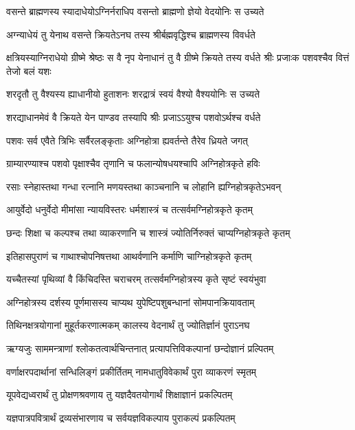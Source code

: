 \twolineshloka
{वसन्ते ब्राह्मणस्य स्यादाधेयोऽग्निर्नराधिप}
{वसन्तो ब्राह्मणो ज्ञेयो वेदयोनिः स उच्यते}


\twolineshloka
{अग्न्याधेयं तु येनाथ वसन्ते क्रियतेऽनघ}
{तस्य श्रीर्बह्मवृद्धिश्च ब्राह्मणस्य विवर्धते}


\threelineshloka
{क्षत्रियस्याग्निराधेयो ग्रीष्मे श्रेष्ठः स वै नृप}
{येनाधानं तु वै ग्रीष्मे क्रियते तस्य वर्धते}
{श्रीः प्रजाःक पशवश्चैव वित्तं तेजो बलं यशः}


\twolineshloka
{शरदृतौ तु वैश्यस्य ह्याधानीयो हुताशनः}
{शरद्रात्रं स्वयं वैश्यो वैश्ययोनिः स उच्यते}


\twolineshloka
{शरद्याधानमेवं वै क्रियते येन पाण्डव}
{तस्यापि श्रीः प्रजाऽऽयुश्च पशवोऽर्थश्च वर्धते}


\twolineshloka
{पशवः सर्व एवैते त्रिभिः सर्वैरलङ्कृताः}
{अग्निहोत्रा ह्यवर्तन्ते तैरेव ध्रियते जगत्}


\twolineshloka
{ग्राम्यारण्याश्च पशवो पृक्षाश्चैव तृणानि च}
{फलान्योषधयश्चापि अग्निहोत्रकृते हविः}


\twolineshloka
{रसाः स्नेहास्तथा गन्धा रत्नानि मणयस्तथा}
{काञ्चनानि च लोहानि ह्यग्निहोत्रकृतेऽभवन्}


\twolineshloka
{आयुर्वेदो धनुर्वेदो मीमांसा न्यायविस्तरः}
{धर्मशास्त्रं च तत्सर्वमग्निहोत्रकृते कृतम्}


\twolineshloka
{छन्दः शिक्षा च कल्पश्च तथा व्याकरणानि च}
{शास्त्रं ज्योतिर्निरुक्तं चाप्यग्निहोत्रकृते कृतम्}


\twolineshloka
{इतिहासपुराणं च गाथाश्चोपनिषत्तथा}
{आथर्वणानि कर्माणि चाग्निहोत्रकृते कृतम्}


\twolineshloka
{यच्चैतस्यां पृथिव्यां वै किंचिदस्ति चराचरम्}
{तत्सर्वमग्निहोत्रस्य कृते सृष्टं स्वयंभुवा}


\twolineshloka
{अग्निहोत्रस्य दर्शस्य पूर्णमासस्य चाप्यथ}
{युपेष्टिपशुबन्धानां सोमपानक्रियावताम्}


\twolineshloka
{तिथिनक्षत्रयोगानां मुहूर्तकरणात्मकम्}
{कालस्य वेदनार्थं तु ज्योतिर्ज्ञानं पुराऽनघ}


\twolineshloka
{ऋग्यजुः साममन्त्राणां श्लोकतत्वार्थचिन्तनात्}
{प्रत्यापत्तिविकल्पानां छन्दोज्ञानं प्रल्पितम्}


\twolineshloka
{वर्णाक्षरपदार्थानां सन्धिलिङ्गं प्रकीर्तितम्}
{नामधातुविवेकार्थं पुरा व्याकरणं स्मृतम्}


\twolineshloka
{यूपवेद्यध्वरार्थं तु प्रोक्षणश्रवणाय तु}
{यज्ञदैवतयोगार्थं शिक्षाज्ञानं प्रकल्पितम्}


\twolineshloka
{यज्ञपात्रपवित्रार्थं द्रव्यसंभारणाय च}
{सर्वयज्ञविकल्पाय पुराकल्पं प्रकल्पितम्}


